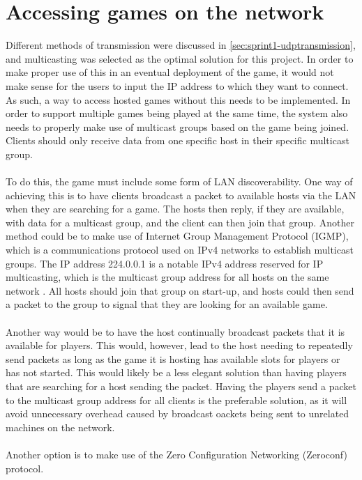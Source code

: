 \section{Accessing games on the network}\label{sec:accessonnetwork}
Different methods of transmission were discussed in \autoref{sec:sprint1-udptransmission}, and multicasting was selected as the optimal solution for this project.
In order to make proper use of this in an eventual deployment of the game, it would not make sense for the users to input the IP address to which they want to connect.
As such, a way to access hosted games without this needs to be implemented.
In order to support multiple games being played at the same time, the system also needs to properly make use of multicast groups based on the game being joined.
Clients should only receive data from one specific host in their specific multicast group.
\\\\
To do this, the game must include some form of LAN discoverability.
One way of achieving this is to have clients broadcast a packet to available hosts via the LAN when they are searching for a game.
The hosts then reply, if they are available, with data for a multicast group, and the client can then join that group.
Another method could be to make use of Internet Group Management Protocol (IGMP), which is a communications protocol used on IPv4 networks to establish multicast groups.
The IP address 224.0.0.1 is a notable IPv4 address reserved for IP multicasting, which is the multicast group address for all hosts on the same network \cite{ipv4multicastaddresses}.
All hosts should join that group on start-up, and hosts could then send a packet to the group to signal that they are looking for an available game.
\\\\
Another way would be to have the host continually broadcast packets that it is available for players.
This would, however, lead to the host needing to repeatedly send packets as long as the game it is hosting has available slots for players or has not started.
This would likely be a less elegant solution than having players that are searching for a host sending the packet.
Having the players send a packet to the multicast group address for all clients is the preferable solution, as it will avoid unnecessary overhead caused by broadcast oackets being sent to unrelated machines on the network.
\\\\
Another option is to make use of the Zero Configuration Networking (Zeroconf) protocol.

